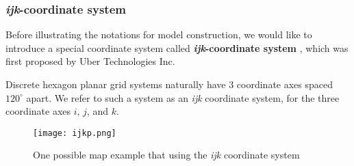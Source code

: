 \documentclass[13pt]{ctexart} %
\begin{document}
\subsubsection{\textit{ijk}-coordinate system}
Before illustrating the notations for model construction, we would like to introduce a special coordinate system called \textbf{\textit{ijk}-coordinate system} \cite{uber-h3-doc}, which was first proposed by Uber Technologies Inc.

Discrete hexagon planar grid systems naturally have $3$ coordinate axes spaced $120^{\circ}$ apart. We refer to such a system as an \textit{ijk} coordinate system, for the three coordinate axes $i$, $j$, and $k$.

\begin {figure}[h]
\centering %
\texttt{[image: ijkp.png]}
\caption{One possible map example that using the \textit{ijk} coordinate system} %
\end {figure}

\end{document}
